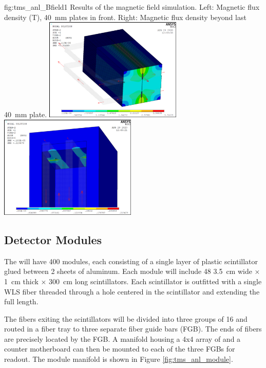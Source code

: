 \begin{dunefigure}{fig:tms_anl_Bfield1}
{Results of the magnetic field simulation.   Left:  Magnetic flux density (T), \SI{40}{\mm} plates in front.  Right:  Magnetic flux density beyond last \SI{40}{\mm}  plate. }
\includegraphics[width=0.49\textwidth]{graphics/tms/Detector/tms_anl_Bfield1.pdf} \includegraphics[width=0.49\textwidth]{graphics/tms/Detector/tms_anl_Bfield2.pdf}
\end{dunefigure}

\subsection{Detector Modules}
\label{sec:tms-des-panels}

The  will have \num{400} modules, each consisting of a single layer of plastic scintillator glued between \num{2} sheets of aluminum.  Each module will include \num{48} \SI{3.5}{\cm} wide $\times$ \SI{1}{\cm} thick $\times$ \SI{300}{\cm} long scintillators.  Each scintillator is outfitted with a single WLS fiber threaded through a hole centered in the scintillator and extending the full length.  

The  fibers exiting the scintillators will be divided into three groups of \num{16} and routed in a fiber tray to three separate fiber guide bars (FGB).  The ends of  fibers are precisely located by the FGB.  A manifold housing a 4x4 array of  and a counter motherboard can then be mounted to each of the three FGBs for readout.  The module manifold is shown in Figure \ref{fig:tms_anl_module}.  

